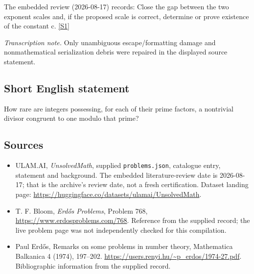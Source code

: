 \documentclass[11pt,a4paper]{article}
\newcommand{\sref}[2]{\hyperlink{source:#1:#2}{[S#2]}}
\begin{document}
The embedded review (2026-08-17) records: Close the gap between the two exponent scales and, if the proposed scale is correct, determine or prove existence of the constant c. \sref{statement}{1}

{\small\emph{Transcription note.} Only unambiguous escape/formatting damage and nonmathematical serialization debris were repaired in the displayed source statement.}

\subsection{Short English statement}

How rare are integers possessing, for each of their prime factors, a nontrivial divisor congruent to one modulo that prime?

\subsection{Sources}

{\small

\begin{itemize}

\item[\hypertarget{source:statement:1}{S1}] ULAM.AI, \emph{UnsolvedMath}, supplied \texttt{problems.json}, catalogue entry, statement and background. The embedded literature-review date is 2026-08-17; that is the archive’s review date, not a fresh certification. Dataset landing page: \url{https://huggingface.co/datasets/ulamai/UnsolvedMath}.

\item[\hypertarget{source:statement:2}{S2}] T. F. Bloom, \emph{Erdős Problems}, Problem 768, \url{https://www.erdosproblems.com/768}. Reference from the supplied record; the live problem page was not independently checked for this compilation.

\item[\hypertarget{source:statement:3}{S3}] Paul Erdős, Remarks on some problems in number theory, Mathematica Balkanica 4 (1974), 197--202. \url{https://users.renyi.hu/~p_erdos/1974-27.pdf}. Bibliographic information from the supplied record.

\end{itemize}

}

\label{end:statement}
\end{document}
